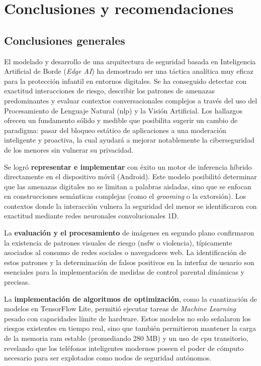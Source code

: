 \chapter[Conclusiones y recomendaciones]{Conclusiones y recomendaciones}
\label{chap:conclusiones}

\insertminitoc
\parindent0pt

\section{Conclusiones generales}

El modelado y desarrollo de una arquitectura de seguridad basada en Inteligencia Artificial de Borde (\textit{Edge AI}) ha demostrado ser una táctica analítica muy eficaz para la protección infantil en entornos digitales. Se ha conseguido detectar con exactitud interacciones de riesgo, describir los patrones de amenazas predominantes y evaluar contextos conversacionales complejos a través del uso del Procesamiento de Lenguaje Natural (\gls{nlp}) y la Visión Artificial. Los hallazgos ofrecen un fundamento sólido y medible que posibilita sugerir un cambio de paradigma: pasar del bloqueo estático de aplicaciones a una moderación inteligente y proactiva, la cual ayudará a mejorar notablemente la ciberseguridad de los menores sin vulnerar su privacidad.

Se logró \textbf{representar e implementar} con éxito un motor de inferencia híbrido directamente en el dispositivo móvil (Android). Este modelo posibilitó determinar que las amenazas digitales no se limitan a palabras aisladas, sino que se enfocan en construcciones semánticas complejas (como el \textit{grooming} o la extorsión). Los contextos donde la interacción vulnera la seguridad del menor se identificaron con exactitud mediante redes neuronales convolucionales 1D.

La \textbf{evaluación y el procesamiento} de imágenes en segundo plano confirmaron la existencia de patrones visuales de riesgo (\gls{nsfw} o violencia), típicamente asociados al consumo de redes sociales o navegadores web. La identificación de estos patrones y la determinación de falsos positivos en la interfaz de usuario son esenciales para la implementación de medidas de control parental dinámicas y precisas.

La \textbf{implementación de algoritmos de optimización}, como la cuantización de modelos en TensorFlow Lite, permitió ejecutar tareas de \textit{Machine Learning} pesado con capacidades límite de hardware. Estos modelos no solo señalaron los riesgos existentes en tiempo real, sino que también permitieron mantener la carga de la memoria \gls{ram} estable (promediando 280 MB) y un uso de \gls{cpu} transitorio, revelando que los teléfonos inteligentes modernos poseen el poder de cómputo necesario para ser explotados como nodos de seguridad autónomos.

